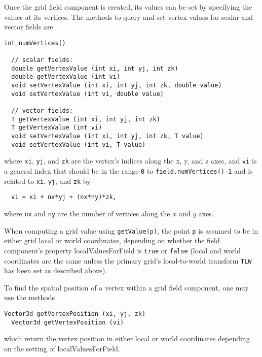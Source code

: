Once the grid field component is created, its values can be set by
specifying the values at its vertices. The methods to 
query and set vertex values for scalar and vector fields are
%
\begin{lstlisting}[]
  int numVertices()

  // scalar fields:
  double getVertexValue (int xi, int yj, int zk)
  double getVertexValue (int vi)
  void setVertexValue (int xi, int yj, int zk, double value)
  void setVertexValue (int vi, double value)

  // vector fields:
  T getVertexValue (int xi, int yj, int zk)
  T getVertexValue (int vi)
  void setVertexValue (int xi, int yj, int zk, T value)
  void setVertexValue (int vi, T value)
\end{lstlisting}
%
where {\tt xi}, {\tt yj}, and {\tt zk} are the vertex's indices along
the x, y, and z axes, and {\tt vi} is a general index that should be
in the range {\tt 0} to {\tt field.numVertices()-1} and is related to
{\tt xi}, {\tt yj}, and {\tt zk} by
%
\begin{verbatim}
  vi = xi + nx*yj + (nx*ny)*zk,
\end{verbatim}
where {\tt nx} and {\tt ny} are the number of vertices along the $x$
and $y$ axes.

When computing a grid value using {\tt getValue(p)}, the point {\tt p}
is assumed to be in either grid local or world coordinates, depending
on whether the field component's property {\sf localValuesForField} is
{\tt true} or {\tt false} (local and world coordinates are the same
unless the primary grid's local-to-world transform {\tt TLW} has been
set as described above).

To find the spatial position of a vertex within a grid field
component, one may use the methods
%
\begin{lstlisting}[]
  Vector3d getVertexPosition (xi, yj, zk)
  Vector3d getVertexPosition (vi)
\end{lstlisting}
%
which return the vertex position in either local or world coordinates
depending on the setting of {\sf localValuesForField}.

